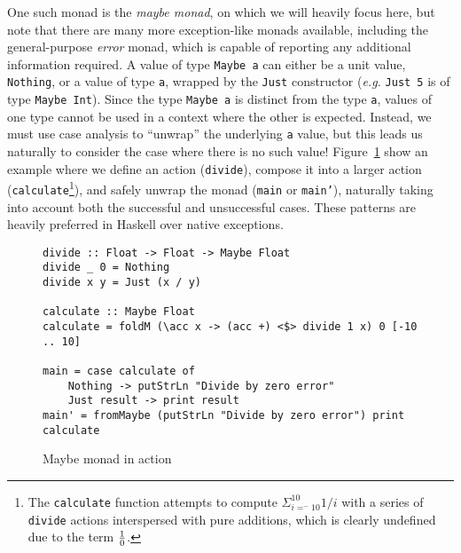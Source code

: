 \documentclass[11pt]{article}
\begin{document}
One such monad is the \emph{maybe monad}, on which we will heavily focus here, but note that there are many more exception-like monads available, including the general-purpose \emph{error} monad, which is capable of reporting any additional information required.
A value of type \texttt{Maybe a} can either be a unit value, \texttt{Nothing}, or a value of type \texttt{a}, wrapped by the \texttt{Just} constructor (\textit{e.g.} \texttt{Just 5} is of type \texttt{Maybe Int}).
Since the type \texttt{Maybe a} is distinct from the type \texttt{a}, values of one type cannot be used in a context where the other is expected.
Instead, we must use case analysis to ``unwrap'' the underlying \texttt{a} value, but this leads us naturally to consider the case where there is no such value!
Figure~\ref{maybeMonad} show an example where we define an action (\texttt{divide}), compose it into a larger action (\texttt{calculate}\footnote{The \texttt{calculate} function attempts to compute $\Sigma_{i=^-10}^{10}{1/i}$ with a series of \texttt{divide} actions interspersed with pure additions, which is clearly undefined due to the term $1\over0$.}), and safely unwrap the monad (\texttt{main} or \texttt{main'}), naturally taking into account both the successful and unsuccessful cases.
These patterns are heavily preferred in Haskell over native exceptions.

\begin{figure}[H]
\caption{Maybe monad in action}
\label{maybeMonad}
\begin{verbatim}
divide :: Float -> Float -> Maybe Float
divide _ 0 = Nothing
divide x y = Just (x / y)

calculate :: Maybe Float
calculate = foldM (\acc x -> (acc +) <$> divide 1 x) 0 [-10 .. 10]

main = case calculate of
    Nothing -> putStrLn "Divide by zero error"
    Just result -> print result
main' = fromMaybe (putStrLn "Divide by zero error") print calculate
\end{verbatim}
\end{figure}
\end{document}

